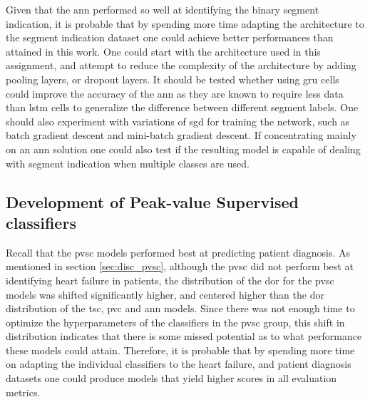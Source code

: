 Given that the \acrshort{ann} performed so well at identifying the binary segment indication, it is probable that by spending more time adapting the architecture to the segment indication dataset one could achieve better performances than attained in this work. One could start with the architecture used in this assignment, and attempt to reduce the complexity of the architecture by adding pooling layers, or dropout layers. It should be tested whether using \acrshort{gru} cells could improve the accuracy of the \acrshort{ann} as they are known to require less data than \acrshort{lstm} cells to generalize the difference between different segment labels. One should also experiment with variations of \acrshort{sgd} for training the network, such as batch gradient descent and mini-batch gradient descent. If concentrating mainly on an \acrshort{ann} solution one could also test if the resulting model is capable of dealing with segment indication when multiple classes are used. 

\subsection*{Development of Peak-value Supervised classifiers}

Recall that the \acrshort{pvsc} models performed best at predicting patient diagnosis. As mentioned in section \ref{sec:disc_pvsc}, although the \acrshort{pvsc} did not perform best at identifying heart failure in patients, the distribution of the \acrshort{dor} for the \acrshort{pvsc} models was shifted significantly higher, and centered higher than the \acrshort{dor} distribution of the \acrshort{tsc}, \acrshort{pvc} and \acrshort{ann} models. Since there was not enough time to optimize the hyperparameters of the classifiers in the \acrshort{pvsc} group, this shift in distribution indicates that there is some missed potential as to what performance these models could attain. Therefore, it is probable that by spending more time on adapting the individual classifiers to the heart failure, and patient diagnosis datasets one could produce models that yield higher scores in all evaluation metrics.